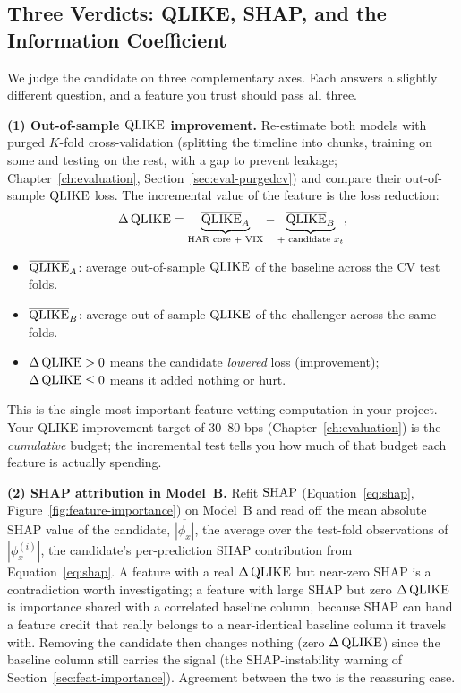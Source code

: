 \subsection{Three Verdicts: QLIKE, SHAP, and the Information Coefficient}\label{sec:feat-incremental-verdicts}

We judge the candidate on three complementary axes. Each answers a slightly different question, and a feature you trust should pass all three.

\textbf{(1) Out-of-sample $\operatorname{QLIKE}$ improvement.} Re-estimate both models with purged $K$-fold cross-validation (splitting the timeline into chunks, training on some and testing on the rest, with a gap to prevent leakage; Chapter~\ref{ch:evaluation}, Section~\ref{sec:eval-purgedcv}) and compare their out-of-sample $\operatorname{QLIKE}$ loss. The incremental value of the feature is the loss reduction:
\begin{equation}\label{eq:incremental-qlike}
\Delta \operatorname{QLIKE} = \underbrace{\overline{\operatorname{QLIKE}}_A}_{\text{HAR core + VIX}} - \underbrace{\overline{\operatorname{QLIKE}}_B}_{\text{+ candidate } x_t},
\end{equation}
\begin{itemize}[nosep]
  \item $\overline{\operatorname{QLIKE}}_A$: average out-of-sample $\operatorname{QLIKE}$ of the baseline across the CV test folds.
  \item $\overline{\operatorname{QLIKE}}_B$: average out-of-sample $\operatorname{QLIKE}$ of the challenger across the same folds.
  \item $\Delta \operatorname{QLIKE} > 0$ means the candidate \emph{lowered} loss (improvement); $\Delta \operatorname{QLIKE} \le 0$ means it added nothing or hurt.
\end{itemize}

\begin{projectconnection}
This is the single most important feature-vetting computation in your project. Your QLIKE improvement target of 30--80 bps (Chapter~\ref{ch:evaluation}) is the \emph{cumulative} budget; the incremental test tells you how much of that budget each feature is actually spending.
\end{projectconnection}

\textbf{(2) SHAP attribution in Model~B.} Refit $\operatorname{SHAP}$ (Equation~\ref{eq:shap}, Figure~\ref{fig:feature-importance}) on Model~B and read off the mean absolute SHAP value of the candidate, $\overline{|\phi_x|}$, the average over the test-fold observations of $|\phi_x^{(i)}|$, the candidate's per-prediction SHAP contribution from Equation~\ref{eq:shap}. A feature with a real $\Delta\operatorname{QLIKE}$ but near-zero SHAP is a contradiction worth investigating; a feature with large SHAP but zero $\Delta\operatorname{QLIKE}$ is importance shared with a correlated baseline column, because SHAP can hand a feature credit that really belongs to a near-identical baseline column it travels with. Removing the candidate then changes nothing (zero $\Delta\operatorname{QLIKE}$) since the baseline column still carries the signal (the SHAP-instability warning of Section~\ref{sec:feat-importance}). Agreement between the two is the reassuring case.

